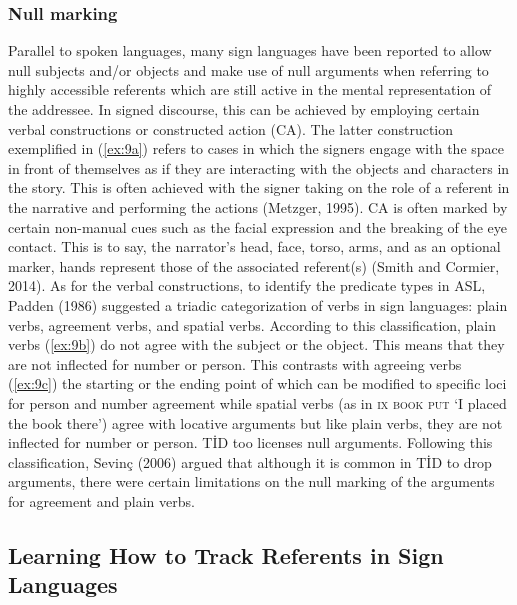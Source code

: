\documentclass[]{elsarticle} %
\begin{document}
\hypertarget{null-marking}{%
\subsubsection{Null marking}\label{null-marking}}

Parallel to spoken languages, many sign languages have been reported to
allow null subjects and/or objects and make use of null arguments when
referring to highly accessible referents which are still active in the
mental representation of the addressee. In signed discourse, this can be
achieved by employing certain verbal constructions or constructed action
(CA). The latter construction exemplified in (\ref{ex:9a}) refers to
cases in which the signers engage with the space in front of themselves
as if they are interacting with the objects and characters in the story.
This is often achieved with the signer taking on the role of a referent
in the narrative and performing the actions (Metzger, 1995). CA is often
marked by certain non-manual cues such as the facial expression and the
breaking of the eye contact. This is to say, the narrator's head, face,
torso, arms, and as an optional marker, hands represent those of the
associated referent(s) (Smith and Cormier, 2014). As for the verbal
constructions, to identify the predicate types in ASL, Padden (1986)
suggested a triadic categorization of verbs in sign languages: plain
verbs, agreement verbs, and spatial verbs. According to this
classification, plain verbs (\ref{ex:9b}) do not agree with the subject
or the object. This means that they are not inflected for number or
person. This contrasts with agreeing verbs (\ref{ex:9c}) the starting or
the ending point of which can be modified to specific loci for person
and number agreement while spatial verbs (as in \textsc{ix book put} `I
placed the book there') agree with locative arguments but like plain
verbs, they are not inflected for number or person. TİD too licenses
null arguments. Following this classification, Sevinç (2006) argued that
although it is common in TİD to drop arguments, there were certain
limitations on the null marking of the arguments for agreement and plain
verbs.

\hypertarget{learning-how-to-track-referents-in-sign-languages}{%
\subsection{Learning How to Track Referents in Sign
Languages}\label{learning-how-to-track-referents-in-sign-languages}}
\end{document}

